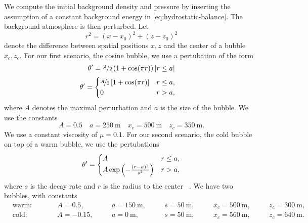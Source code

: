 \documentclass[runningheads]{llncs}
\newcommand{\eqA}{}
\newcommand{\eqB}{(}
\newcommand{\eqMultiA}{(}
\newcommand{\eqMultiB}{)}
\DeclareRobustCommand{\pcrefSingle}[1]{%
\begingroup%
  \renewcommand{\eqA}{(}\renewcommand{\eqB}{}%
\cref{#1}%
\endgroup%
}
\DeclareRobustCommand{\pcrefMulti}[1]{%
\begingroup%
    \renewcommand{\eqMultiA}{}\renewcommand{\eqMultiB}{}%
    (\cref{#1})%
\endgroup%
}
\DeclareRobustCommand{\pcref}[1]{%
\IfSubStr{#1}{,}{\pcrefMulti{#1}}{\pcrefSingle{#1}}%
}
\begin{document}
We compute the initial background density and pressure by inserting the assumption of a constant background energy in \cref{eq:hydrostatic-balance}.
The background atmosphere is then perturbed.
Let
\begin{equation}
  \label{eq:radius}
  r^2 = (x - x_0)^2 + (z - z_0)^2
\end{equation}
denote the difference between spatial positions $x,z$ and the center of a bubble $x_c, z_c$.
For our first scenario, the cosine bubble, we use a pertubation of the form
\begin{equation}
  \label{eq:cos-pertubation-alt}
  \theta' = 
    \nicefrac{A}{2} \left( 1 + \cos(\pi r) \right) \left[ r \leq a \right]
\end{equation}
\begin{align}
  \label{eq:cos-pertubation}
  \theta' &= \begin{cases}
    \nicefrac{A}{2} \left[ 1 + \cos(\pi r) \right] & r \leq a, \\
    0 & r > a,
    \end{cases}
\end{align}
where $A$ denotes the maximal perturbation and $a$ is the size of the bubble.
We use the constants
\begin{equation}\label{eq:cosine-bubble}
  A = 0.5 \quad a = \SI{250}{\m} \quad x_c = \SI{500}{\m} \quad z_c = \SI{350}{\m}.
\end{equation}
We use a constant viscosity of $\mu = 0.1$.
For our second scenario, the cold bubble on top of a warm bubble, we use the pertubations
\begin{equation}
  \label{eq:bubbles-pertubation}
  \theta' =
  \begin{cases}
    A & r \leq a, \\
    A \exp \left( - \frac{(r-a)^2}{s^2} \right) & r > a,
    \end{cases}
\end{equation}
where $s$ is the decay rate and $r$  is the radius to the center~\pcref{eq:radius}.
We have two bubbles, with constants
\begin{equation}
  \label{eq:bubbles-values}
\begin{alignedat}{6}
  & \text{warm:} \qquad && A = 0.5, \quad&& a = \SI{150}{\m}, \quad&& s = \SI{50}{\m}, \quad&& x_c = \SI{500}{\m,} \quad&& z_c = \SI{300}{\m},\\
  & \text{cold:} \qquad && A = -0.15, \quad&& a = \SI{0}{\m}, \quad&& s = \SI{50}{\m}, \quad&& x_c = \SI{560}{\m}, \quad&& z_c = \SI{640}{\m}.
  \end{alignedat}
\end{equation}
\end{document}
